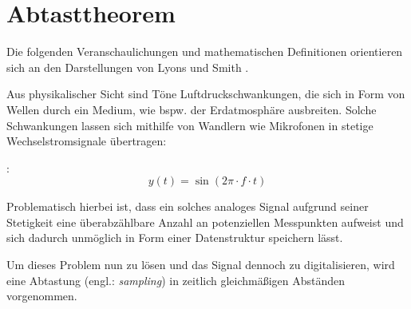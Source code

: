\section{Abtasttheorem}
\label{sec:abttastheorem}

Die folgenden Veranschaulichungen und mathematischen Definitionen orientieren sich an den Darstellungen von
Lyons \cite[Kap. 1]{lyons2011} und Smith \cite[Kap. 3]{smith1997}.

Aus physikalischer Sicht sind Töne Luftdruckschwankungen, die sich in Form von Wellen durch ein Medium, wie
bspw. der Erdatmosphäre ausbreiten. Solche Schwankungen lassen sich mithilfe von Wandlern wie Mikrofonen in
stetige Wechselstromsignale übertragen:

\cite[Kap. 1]{lyons2011}:
\begin{equation}
    y(t) = \sin(2\pi \cdot f \cdot t)
    \label{eq:stetige_gleichung}
\end{equation}

Problematisch hierbei ist, dass ein solches analoges Signal aufgrund seiner Stetigkeit eine überabzählbare
Anzahl an potenziellen Messpunkten aufweist und sich dadurch unmöglich in Form einer Datenstruktur speichern lässt.

Um dieses Problem nun zu lösen und das Signal dennoch zu digitalisieren,
wird eine Abtastung (engl.: \textit{sampling})
in zeitlich gleichmäßigen Abständen vorgenommen.